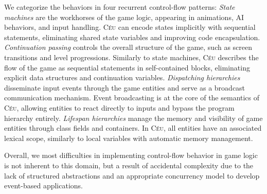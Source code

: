\documentclass[10pt, conference, compsocconf]{IEEEtran}
\newcommand{\CEU}{\textsc{C\'{e}u}\xspace}
\begin{document}
We categorize the behaviors in four recurrent control-flow patterns:
%
\emph{State machines} are the workhorses of the game logic, appearing in
animations, AI behaviors, and input handling.
\CEU can encode states implicitly with sequential statements,
eliminating shared state variables and improving code encapsulation.
%
\emph{Continuation passing} controls the overall structure of the game, such as
screen transitions and level progressions.
Similarly to state machines, \CEU describes the flow of the game as sequential
statements in self-contained blocks, eliminating explicit data structures and
continuation variables.
%
\emph{Dispatching hierarchies} disseminate input events through the game
entities and serve as a broadcast communication mechanism.
Event broadcasting is at the core of the semantics of \CEU, allowing entities
to react directly to inputs and bypass the program hierarchy entirely.
%
\emph{Lifespan hierarchies} manage the memory and visibility of game entities
through class fields and containers.
In \CEU, all entities have an associated lexical scope, similarly to local
variables with automatic memory management.

Overall, we most difficulties in implementing control-flow behavior in game
logic is not inherent to this domain, but a result of accidental complexity due
to the lack of structured abstractions and an appropriate concurrency model to
develop event-based applications.

\end{document}
